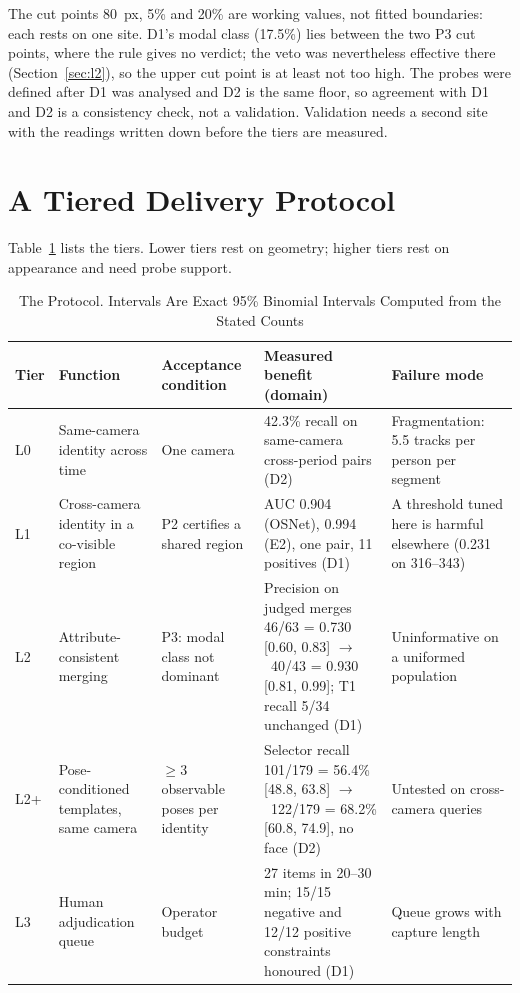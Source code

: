 \documentclass[journal]{IEEEtran}
\newcommand{\ra}{$\rightarrow$}
\begin{document}
The cut points 80~px, 5\% and 20\% are working values, not fitted boundaries: each rests on one site. D1's modal class (17.5\%) lies between the two P3 cut points, where the rule gives no verdict; the veto was nevertheless effective there (Section~\ref{sec:l2}), so the upper cut point is at least not too high. The probes were defined after D1 was analysed and D2 is the same floor, so agreement with D1 and D2 is a consistency check, not a validation. Validation needs a second site with the readings written down before the tiers are measured.

\section{A Tiered Delivery Protocol}\label{sec:tiers}
Table~\ref{tab:protocol} lists the tiers. Lower tiers rest on geometry; higher tiers rest on appearance and need probe support.

\begin{table}[t]
\caption{The Protocol. Intervals Are Exact 95\% Binomial Intervals Computed from the Stated Counts}\label{tab:protocol}
\centering
\begin{tabular}{@{}p{0.6cm}p{2.9cm}p{2.6cm}p{6.3cm}p{4.0cm}@{}}
\toprule
Tier & Function & Acceptance condition & Measured benefit (domain) & Failure mode\\
\midrule
L0 & Same-camera identity across time & One camera & 42.3\% recall on same-camera cross-period pairs (D2) & Fragmentation: 5.5 tracks per person per segment\\
L1 & Cross-camera identity in a co-visible region & P2 certifies a shared region & AUC 0.904 (OSNet), 0.994 (E2), one pair, 11 positives (D1) & A threshold tuned here is harmful elsewhere (0.231 on 316--343)\\
L2 & Attribute-consistent merging & P3: modal class not dominant & Precision on judged merges 46/63 = 0.730 [0.60, 0.83] \ra\ 40/43 = 0.930 [0.81, 0.99]; T1 recall 5/34 unchanged (D1) & Uninformative on a uniformed population\\
L2+ & Pose-conditioned templates, same camera & $\ge 3$ observable poses per identity & Selector recall 101/179 = 56.4\% [48.8, 63.8] \ra\ 122/179 = 68.2\% [60.8, 74.9], no face (D2) & Untested on cross-camera queries\\
L3 & Human adjudication queue & Operator budget & 27 items in 20--30 min; 15/15 negative and 12/12 positive constraints honoured (D1) & Queue grows with capture length\\
\bottomrule
\end{tabular}
\end{table}
\end{document}
